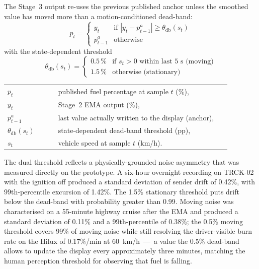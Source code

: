 The Stage~3 output re-uses the previous published anchor unless the smoothed value has moved more than a motion-conditioned dead-band:
\begin{equation}
p_t =
\begin{cases}
y_t & \text{if } |y_t - p^{a}_{t-1}| \geq \theta_{\mathrm{db}}(s_t) \\[2pt]
p^{a}_{t-1} & \text{otherwise}
\end{cases}
\label{eq:deadband_filter}
\end{equation}
with the state-dependent threshold
\begin{equation}
\theta_{\mathrm{db}}(s_t) =
\begin{cases}
0.5\,\% & \text{if } s_t > 0 \text{ within last 5 s (moving)} \\[2pt]
1.5\,\% & \text{otherwise (stationary)}
\end{cases}
\label{eq:deadband_threshold}
\end{equation}
\noindent\begin{tabular}{@{}p{0.20\linewidth}@{\quad}p{0.68\linewidth}@{}}
$p_t$ & published fuel percentage at sample $t$ (\%), \\
$y_t$ & Stage~2 EMA output (\%), \\
$p^{a}_{t-1}$ & last value actually written to the display (anchor), \\
$\theta_{\mathrm{db}}(s_t)$ & state-dependent dead-band threshold (pp), \\
$s_t$ & vehicle speed at sample $t$ (km/h).
\end{tabular}

\vspace{0.5em}

The dual threshold reflects a physically-grounded noise asymmetry that was measured directly on the prototype. A six-hour overnight recording on TRCK-02 with the ignition off produced a standard deviation of sender drift of 0.42\%, with 99th-percentile excursion of 1.42\%. The 1.5\% stationary threshold puts drift below the dead-band with probability greater than 0.99. Moving noise was characterised on a 55-minute highway cruise after the EMA and produced a standard deviation of 0.11\% and a 99th-percentile of 0.38\%; the 0.5\% moving threshold covers 99\% of moving noise while still resolving the driver-visible burn rate on the Hilux of 0.17\%/min at 60~km/h~---~a value the 0.5\% dead-band allows to update the display every approximately three minutes, matching the human perception threshold for observing that fuel is falling.

